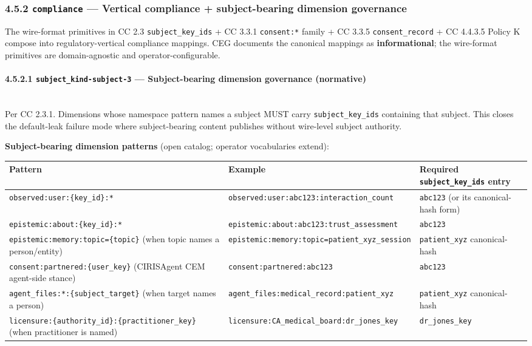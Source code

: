 \documentclass[11pt]{article}
\begin{document}
\subsubsection*{4.5.2 \texttt{compliance} — Vertical compliance + subject-bearing dimension governance}


The wire-format primitives in CC 2.3 \texttt{subject\_key\_ids} + CC 3.3.1 \texttt{consent:*} family + CC 3.3.5 \texttt{consent\_record} + CC 4.4.3.5 Policy K compose into regulatory-vertical compliance mappings. CEG documents the canonical mappings as \textbf{informational}; the wire-format primitives are domain-agnostic and operator-configurable.


\paragraph{4.5.2.1 \texttt{subject\_kind-subject-3} — Subject-bearing dimension governance (normative)}\mbox{}\\


Per CC 2.3.1. Dimensions whose namespace pattern names a subject MUST carry \texttt{subject\_key\_ids} containing that subject. This closes the default-leak failure mode where subject-bearing content publishes without wire-level subject authority.


\textbf{Subject-bearing dimension patterns} (open catalog; operator vocabularies extend):


{\footnotesize
\begin{longtable}{|p{5.33cm}|p{5.33cm}|p{5.33cm}|}\hline
\textbf{Pattern} & \textbf{Example} & \textbf{Required \texttt{subject\_key\_ids} entry} \\ \hline\endhead
\texttt{observed:user:\{key\_id\}:*} & \texttt{observed:user:abc123:interaction\_count} & \texttt{abc123} (or its canonical-hash form) \\ \hline
\texttt{epistemic:about:\{key\_id\}:*} & \texttt{epistemic:about:abc123:trust\_assessment} & \texttt{abc123} \\ \hline
\texttt{epistemic:memory:topic=\{topic\}} (when topic names a person/entity) & \texttt{epistemic:memory:topic=patient\_xyz\_session} & \texttt{patient\_xyz} canonical-hash \\ \hline
\texttt{consent:partnered:\{user\_key\}} (CIRISAgent CEM agent-side stance) & \texttt{consent:partnered:abc123} & \texttt{abc123} \\ \hline
\texttt{agent\_files:*:\{subject\_target\}} (when target names a person) & \texttt{agent\_files:medical\_record:patient\_xyz} & \texttt{patient\_xyz} canonical-hash \\ \hline
\texttt{licensure:\{authority\_id\}:\{practitioner\_key\}} (when practitioner is named) & \texttt{licensure:CA\_medical\_board:dr\_jones\_key} & \texttt{dr\_jones\_key} \\ \hline
\end{longtable}}
\end{document}
